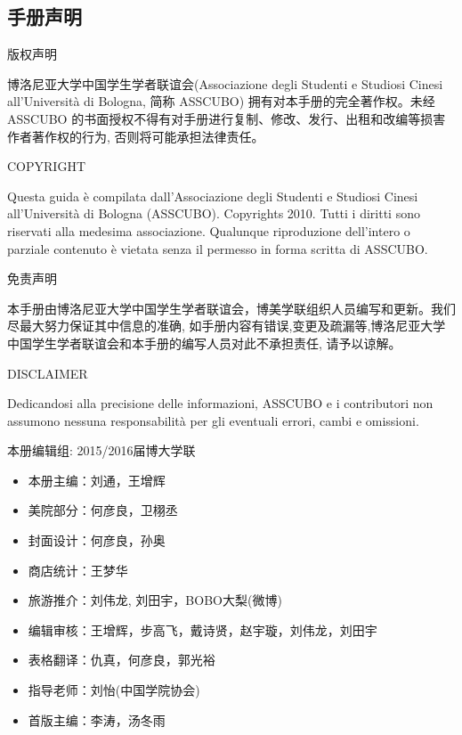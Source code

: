 \begin{titlepage}
\newpage

\topmargin=-2cm                        %

\chapter*{手册声明}                 %
\pagestyle{empty}%
\thispagestyle{empty} 

\vspace{0.5cm}\centerline{\Large 版权声明}
博洛尼亚大学中国学生学者联谊会(Associazione degli Studenti e Studiosi 
Cinesi all’Università di Bologna, 简称 ASSCUBO) 拥有对本手册的完全著作权。未经 ASSCUBO 的书面授权不得有对手册进行复制、修改、发行、出租和改编等损害作者著作权的行为, 否则将可能承担法律责任。 

\vspace{0.5cm}\centerline{\Large COPYRIGHT}
Questa guida è compilata dall’Associazione degli Studenti e Studiosi Cinesi all’Università di Bologna (ASSCUBO). Copyrights 2010. Tutti i diritti sono riservati alla medesima associazione. Qualunque riproduzione dell’intero o parziale contenuto è vietata senza il permesso in forma scritta di ASSCUBO. 

\vspace{0.5cm}\centerline{\Large 免责声明}
本手册由博洛尼亚大学中国学生学者联谊会，博美学联组织人员编写和更新。我们尽最大努力保证其中信息的准确, 如手册内容有错误,变更及疏漏等,博洛尼亚大学中国学生学者联谊会和本手册的编写人员对此不承担责任, 请予以谅解。 

\vspace{0.5cm}\centerline{\Large DISCLAIMER}
Dedicandosi alla precisione delle informazioni, ASSCUBO e i contributori non assumono nessuna responsabilità per gli eventuali errori, cambi e omissioni. 

\newpage

\topmargin=0cm 

\vspace{3cm}\centerline{\Large 本册编辑组: 2015/2016届博大学联} 

\begin{itemize}
\item[] 本册主编：刘通，王增辉
\item[] 美院部分：何彦良，卫栩丞
\item[] 封面设计：何彦良，孙奥
\item[] 商店统计：王梦华
\item[] 旅游推介：刘伟龙, 刘田宇，BOBO大梨(微博)
\item[] 编辑审核：王增辉，步高飞，戴诗贤，赵宇璇，刘伟龙，刘田宇
\item[] 表格翻译：仇真，何彦良，郭光裕
\item[] 指导老师：刘怡(中国学院协会)
\item[] 首版主编：李涛，汤冬雨
\end{itemize}


\clearpage{\pagestyle{empty}\cleardoublepage}%
\end{titlepage}

